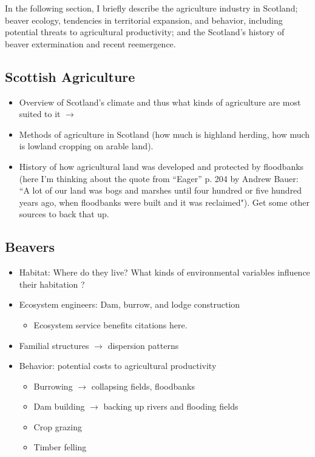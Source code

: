 
In the following section, I briefly describe the agriculture industry in Scotland; beaver ecology, tendencies in territorial expansion, and behavior, including potential threats to agricultural productivity; and the Scotland's history of beaver extermination and recent reemergence. 

\subsection{Scottish Agriculture}

\begin{itemize}
    \item Overview of Scotland's climate and thus what kinds of agriculture are most suited to it $\rightarrow$
    \item Methods of agriculture in Scotland (how much is highland herding, how much is lowland cropping on arable land).
    \item History of how agricultural land was developed and protected by floodbanks (here I'm thinking about the quote from ``Eager'' p. 204 by Andrew Bauer: ``A lot of our land was bogs and marshes until four hundred or five hundred years ago, when floodbanks were built and it was reclaimed"). Get some other sources to back that up.
\end{itemize}

\subsection{Beavers}

\begin{itemize}
    \item Habitat: Where do they live? What kinds of environmental variables influence their habitation \parencite{swinnen_environmental_2019}?
    \item Ecosystem engineers: Dam, burrow, and lodge construction
    \begin{itemize}
        \item Ecosystem service benefits citations here.
    \end{itemize}
    \item Familial structures $\rightarrow$ dispersion patterns
    \item Behavior: potential costs to agricultural productivity
    \begin{itemize}
        \item Burrowing $\rightarrow$ collapsing fields, floodbanks
        \item Dam building $\rightarrow$ backing up rivers and flooding fields
        \item Crop grazing
        \item Timber felling
    \end{itemize}
\end{itemize}

